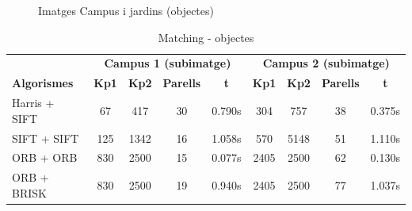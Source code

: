 		\begin{figure}[!htb]
			\caption{Imatges Campus i jardins (objectes)}
		\end{figure}

		\begin{table}[H]
			\begin{center}
				\begin{tabular}{l | c c c c | c c c c}
					& \multicolumn{4}{c|}{\textbf{Campus 1 (subimatge)}} & \multicolumn{4}{c}{\textbf{Campus 2 (subimatge)}} \\
					\textbf{Algorismes} & \textbf{Kp1} & \textbf{Kp2} & \textbf{Parells} & \textbf{t} & \textbf{Kp1} & \textbf{Kp2} & \textbf{Parells} & \textbf{t} \\ \hline
					Harris + SIFT & 67 & 417 & 30 & 0.790s & 304 & 757 & 38 & 0.375s \\
					SIFT + SIFT & 125 & 1342 & 16 & 1.058s & 570 & 5148 & 51 & 1.110s \\
					ORB + ORB & 830 & 2500 & 15 & 0.077s & 2405 & 2500 & 62 & 0.130s \\
					ORB + BRISK & 830 & 2500 & 19 & 0.940s & 2405 & 2500 & 77 & 1.037s \\
				\end{tabular}
			\end{center}
			\caption{Matching - objectes}
		\end{table}

